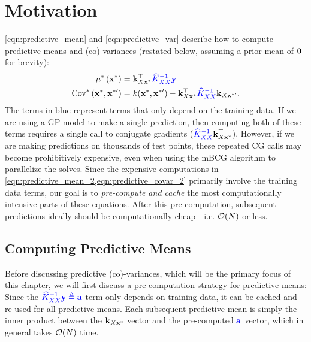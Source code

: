 \section{Motivation}
\label{sec:love_motivation}

\cref{eqn:predictive_mean} and \cref{eqn:predictive_var} describe how to compute predictive means and (co)-variances (restated below, assuming a prior mean of $\mathbf{0}$ for brevity):
%
\begin{align}
  \mu^* \left( \mathbf{x}^* \right)
  &= \mathbf{k}_{X \mathbf{x}^*}^\top {\color{blue} \ensuremath{\widehat{K}_{XX}}^{-1} \ensuremath{\mathbf{y}}}
  \label{eqn:predictive_mean_2}
  \\
  \text{Cov}^* \left( \mathbf{x}^*, \mathbf{x}^{*\prime} \right)
  &= k(\mathbf{x}^*, \mathbf{x}^{*\prime}) - \mathbf{k}_{X\mathbf{x}^*}^\top {\color{blue} \ensuremath{\widehat{K}_{XX}}^{-1}} \mathbf{k}_{X\mathbf{x}^{*\prime}}.
  \label{eqn:predictive_covar_2}
\end{align}
%
The terms in {\color{blue} blue} represent terms that only depend on the training data.
If we are using a GP model to make a single prediction, then computing both of these terms requires a single call to conjugate gradients (${\color{blue} \widehat{K}_{XX}^{-1}} \mathbf{k}^\top_{X\mathbf{x}^*}$).
However, if we are making predictions on thousands of test points, these repeated CG calls may become prohibitively expensive, even when using the mBCG algorithm to parallelize the solves.
Since the expensive computations in \cref{eqn:predictive_mean_2,eqn:predictive_covar_2} primarily involve the training data terms, our goal is to \emph{pre-compute and cache} the most computationally intensive parts of these equations.
After this pre-computation, subsequent predictions ideally should be computationally cheap---i.e. $\bigo{N}$ or less.

\subsection{Computing Predictive Means}

Before discussing predictive (co)-variances, which will be the primary focus of this chapter, we will first discuss a pre-computation strategy for predictive means:
Since the ${\color{blue} \widehat{K}_{XX}^{-1} \mathbf{y} \triangleq \mathbf{a}}$ term only depends on training data, it can be cached and re-used for all predictive means.
Each subsequent predictive mean is simply the inner product between the $\mathbf{k}_{X \mathbf{x}^*}$ vector and the pre-computed $\color{blue} \mathbf{a}$ vector, which in general takes $\bigo{N}$ time.


